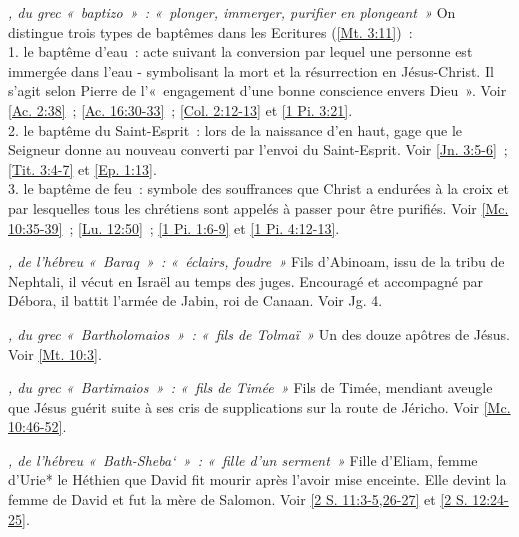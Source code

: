 \begin{multicols}{2}
\textit{, du grec «~baptizo~»~: «~plonger, immerger, purifier en plongeant~»}\newline
On distingue trois types de baptêmes dans les Ecritures (\vref{Mt. 3:11})~:
\\1. le baptême d'eau~: acte suivant la conversion par lequel une personne est immergée dans l'eau - symbolisant la mort et la résurrection en Jésus-Christ. Il s'agit selon Pierre de l'«~engagement d'une bonne conscience envers Dieu~». Voir \vref{Ac. 2:38}~; \vref{Ac. 16:30-33}~; \vref{Col. 2:12-13} et \vref{1 Pi. 3:21}.
\\2. le baptême du Saint-Esprit~: lors de la naissance d'en haut, gage que le Seigneur donne au nouveau converti par l'envoi du Saint-Esprit. Voir \vref{Jn. 3:5-6}~; \vref{Tit. 3:4-7} et \vref{Ep. 1:13}.
\\3. le baptême de feu~: symbole des souffrances que Christ a endurées à la croix et par lesquelles tous les chrétiens sont appelés à passer pour être purifiés.\newline
Voir \vref{Mc. 10:35-39}~; \vref{Lu. 12:50}~; \vref{1 Pi. 1:6-9} et \vref{1 Pi. 4:12-13}.

\textit{, de l'hébreu «~Baraq~»~: «~éclairs, foudre~»}\newline
Fils d'Abinoam, issu de la tribu de Nephtali, il vécut en Israël au temps des juges. Encouragé et accompagné par Débora, il battit l'armée de Jabin, roi de Canaan.\newline
Voir Jg. 4.

\textit{, du grec «~Bartholomaios~»~: «~fils de Tolmaï~»}\newline
Un des douze apôtres de Jésus.\newline
Voir \vref{Mt. 10:3}.

\textit{, du grec «~Bartimaios~»~: «~fils de Timée~»}\newline
Fils de Timée, mendiant aveugle que Jésus guérit suite à ses cris de supplications sur la route de Jéricho.\newline
Voir \vref{Mc. 10:46-52}.

\textit{, de l'hébreu «~Bath-Sheba`~»~: «~fille d'un serment~»}\newline
Fille d'Eliam, femme d'Urie* le Héthien que David fit mourir après l'avoir mise enceinte. Elle devint la femme de David et fut la mère de Salomon.\newline
Voir \vref{2 S. 11:3-5,26-27} et \vref{2 S. 12:24-25}.


\end{multicols}
